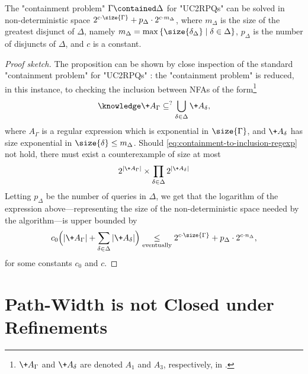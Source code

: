 \begin{proposition}
	\AP\label{prop:bound-containment-pb-alt}
	The "containment problem" $\Gamma \contained \Delta$ for "UC2RPQs" can be solved in non-deterministic space $2^{c\cdot \size{\Gamma}} + p_{\Delta} \cdot 2^{c\cdot m_\Delta}$, where $m_\Delta$ is the size of the greatest disjunct of $\Delta$, namely $m_\Delta = \max{\{\size{\delta_\Delta} \mid \delta \in \Delta\}}$, $p_\Delta$
	is the number of disjuncts of $\Delta$, and $c$ is a constant.
\end{proposition}

\begin{proof}[Proof sketch]
    The proposition can be shown by close inspection of the standard "containment problem" for "UC2RPQs" \cite[Theorem 5]{CalvaneseDeGiacomoLenzeriniVardi2000Containment}: the "containment problem" is reduced, in this instance, to checking the inclusion between NFAs of the form\footnote{$\+A_\Gamma$ and $\+A_\delta$ are denoted $A_1$ and $A_3$, respectively, in \cite{CalvaneseDeGiacomoLenzeriniVardi2000Containment}.}
	\begin{equation}
		\AP\label{eq:containment-to-inclusion-regexp}
		\+A_\Gamma \subseteq^? \bigcup_{\delta \in \Delta} \+A_\delta,
	\end{equation}
	where $A_\Gamma$ is a regular expression which is exponential in $\size{\Gamma}$,
	and $\+A_\delta$ has size exponential in $\size{\delta} \leq m_\Delta$.
	Should \eqref{eq:containment-to-inclusion-regexp} not hold, there must exist a counterexample of size at most 
	\[
		2^{|\+A_\Gamma|}\times \prod_{\delta \in \Delta} 2^{|\+A_\delta|}
	\]
	Letting $p_\Delta$ be the number
	of queries in $\Delta$, we get that the logarithm of the expression above---representing the
	size of the non-deterministic space needed by the algorithm---is upper bounded by
	\[
		c_0 \Bigl(|\+A_\Gamma| + \sum_{\delta \in \Delta} |\+A_\delta|\Bigr)
		\mathrel{\underset{\tiny\textrm{eventually}}{\leq}}
		2^{c\cdot \size{\Gamma}} + p_{\Delta} \cdot 2^{c\cdot n_\Delta},
	\]
	for some constants $c_0$ and $c$.
\end{proof}

\section{Path-Width is not Closed under Refinements}
\label{apdx-sec:path-width-not-closed-refinements}

\pathwidthnotclosed*

